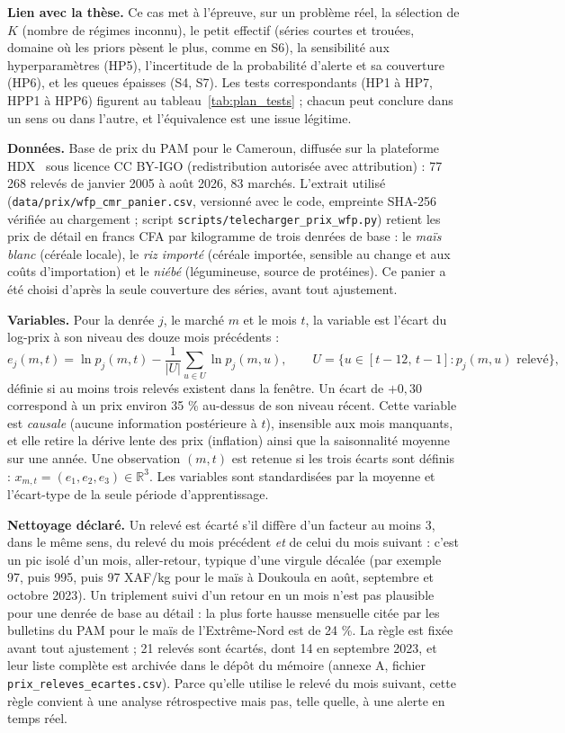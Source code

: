 \textbf{Lien avec la thèse. }Ce cas met à l'épreuve, sur un problème réel, la sélection de $K$ (nombre de régimes inconnu), le petit effectif (séries courtes et trouées, domaine où les priors pèsent le plus, comme en S6), la sensibilité aux hyperparamètres (HP5), l'incertitude de la probabilité d'alerte et sa couverture (HP6), et les queues épaisses (S4, S7). Les tests correspondants (HP1 à HP7, HPP1 à HPP6) figurent au tableau~\ref{tab:plan_tests} ; chacun peut conclure dans un sens ou dans l'autre, et l'équivalence est une issue légitime.

\textbf{Données. }Base de prix du PAM pour le Cameroun, diffusée sur la plateforme HDX~\cite{pam2026donnees} sous licence CC BY-IGO (redistribution autorisée avec attribution) : 77\,268 relevés de janvier 2005 à août 2026, 83 marchés. L'extrait utilisé (\texttt{data/prix/wfp\_cmr\_panier.csv}, versionné avec le code, empreinte SHA-256 vérifiée au chargement ; script \texttt{scripts/telecharger\_prix\_wfp.py}) retient les prix de détail en francs CFA par kilogramme de trois denrées de base : le \emph{maïs blanc} (céréale locale), le \emph{riz importé} (céréale importée, sensible au change et aux coûts d'importation) et le \emph{niébé} (légumineuse, source de protéines). Ce panier a été choisi d'après la seule couverture des séries, avant tout ajustement.

\textbf{Variables. }Pour la denrée $j$, le marché $m$ et le mois $t$, la variable est l'écart du log-prix à son niveau des douze mois précédents :
\[
e_j(m,t) = \ln p_j(m,t) - \frac{1}{|U|}\sum_{u \in U} \ln p_j(m,u), \qquad U = \{u \in [t-12,\, t-1] : p_j(m,u) \text{ relevé}\},
\]
définie si au moins trois relevés existent dans la fenêtre. Un écart de $+0{,}30$ correspond à un prix environ 35 \% au-dessus de son niveau récent. Cette variable est \emph{causale} (aucune information postérieure à $t$), insensible aux mois manquants, et elle retire la dérive lente des prix (inflation) ainsi que la saisonnalité moyenne sur une année. Une observation $(m,t)$ est retenue si les trois écarts sont définis : $x_{m,t} = (e_1, e_2, e_3) \in \mathbb{R}^3$. Les variables sont standardisées par la moyenne et l'écart-type de la seule période d'apprentissage.

\textbf{Nettoyage déclaré. }Un relevé est écarté s'il diffère d'un facteur au moins 3, dans le même sens, du relevé du mois précédent \emph{et} de celui du mois suivant : c'est un pic isolé d'un mois, aller-retour, typique d'une virgule décalée (par exemple 97, puis 995, puis 97 XAF/kg pour le maïs à Doukoula en août, septembre et octobre 2023). Un triplement suivi d'un retour en un mois n'est pas plausible pour une denrée de base au détail : la plus forte hausse mensuelle citée par les bulletins du PAM pour le maïs de l'Extrême-Nord est de 24 \%. La règle est fixée avant tout ajustement ; 21 relevés sont écartés, dont 14 en septembre 2023, et leur liste complète est archivée dans le dépôt du mémoire (annexe A, fichier \texttt{prix\_releves\_ecartes.csv}). Parce qu'elle utilise le relevé du mois suivant, cette règle convient à une analyse rétrospective mais pas, telle quelle, à une alerte en temps réel.

